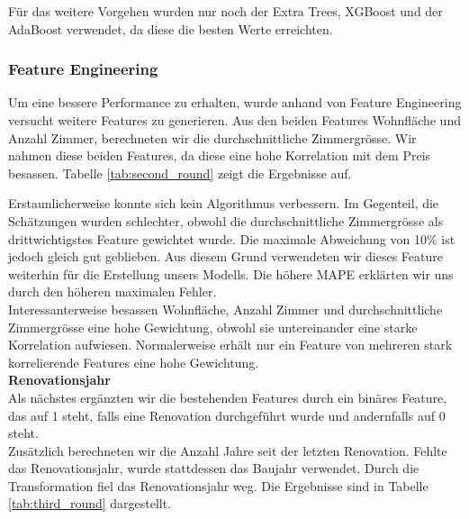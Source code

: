 Für das weitere Vorgehen wurden nur noch der Extra Trees, XGBoost und der AdaBoost verwendet, da diese die besten Werte erreichten.
\subsubsection{Feature Engineering}
Um eine bessere Performance zu erhalten, wurde anhand von Feature Engineering versucht weitere Features zu generieren. Aus den beiden Features Wohnfläche und Anzahl Zimmer, berechneten wir die durchschnittliche Zimmergrösse. Wir nahmen diese beiden Features, da diese eine hohe Korrelation mit dem Preis besassen. Tabelle \ref{tab:second_round} zeigt die Ergebnisse auf.

\begin{table}[ht]
\centering
{}
\caption{Ergebnisse mit durchschnittlicher Zimmergrösse}
\label{tab:second_round}
\end{table}

Erstaunlicherweise konnte sich kein Algorithmus verbessern. Im Gegenteil, die Schätzungen wurden schlechter, obwohl die durchschnittliche Zimmergrösse als drittwichtigstes Feature gewichtet wurde. Die maximale Abweichung von 10\% ist jedoch gleich gut geblieben. Aus diesem Grund verwendeten wir dieses Feature weiterhin für die Erstellung unsers Modells. Die höhere MAPE erklärten wir uns durch den höheren maximalen Fehler.\\
Interessanterweise besassen Wohnfläche, Anzahl Zimmer und durchschnittliche Zimmergrösse eine hohe Gewichtung, obwohl sie untereinander eine starke Korrelation aufwiesen. Normalerweise erhält nur ein Feature von mehreren stark korrelierende Features eine hohe Gewichtung.\\[2ex]
%
\textbf{Renovationsjahr}\\
Als nächstes ergänzten wir die bestehenden Features durch ein binäres Feature, das auf 1 steht, falls eine Renovation durchgeführt wurde und andernfalls auf 0 steht.\\
Zusätzlich berechneten wir die Anzahl Jahre seit der letzten Renovation. Fehlte das Renovationsjahr, wurde stattdessen das Baujahr verwendet. Durch die Transformation fiel das Renovationsjahr weg. Die Ergebnisse sind in Tabelle \ref{tab:third_round} dargestellt.

